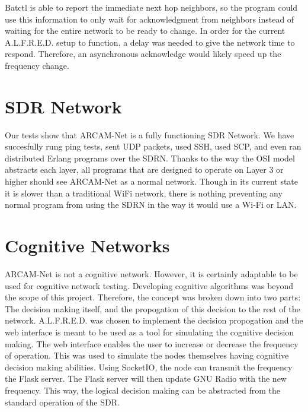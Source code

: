Batctl is able to report the immediate next hop neighbors, so the program could use this information to only wait for acknowledgment from neighbors instead of waiting for the entire network to be ready to change. In order for the current A.L.F.R.E.D. setup to function, a delay was needed to give the network time to respond. Therefore, an asynchronous acknowledge would likely speed up the frequency change. 



\section{SDR Network}

Our tests show that ARCAM-Net is a fully functioning SDR Network. We have succesfully rung ping tests, sent UDP packets, used SSH, used SCP, and even ran distributed Erlang programs over the SDRN. Thanks to the way the OSI model abstracts each layer, all programs that are designed to operate on Layer 3 or higher should see ARCAM-Net as a normal network. Though in its current state it is slower than a traditional WiFi network, there is nothing preventing any normal program from using the SDRN in the way it would use a Wi-Fi or LAN. 


\section{Cognitive Networks}

ARCAM-Net is not a cognitive network. However, it is certainly adaptable to be used for cognitive network testing. Developing cognitive algorithms was beyond the scope of this project. Therefore, the concept was broken down into two parts: The decision making itself, and the propogation of this decision to the rest of the network. A.L.F.R.E.D. was chosen to implement the decision propogation and the web interface is meant to be used as a tool for simulating the cognitive decision making. The web interface enables the user to increase or decrease the frequency of operation. This was used to simulate the nodes themselves having cognitive decision making abilities. Using SocketIO, the node can transmit the frequency the Flask server. The Flask server will then update GNU Radio with the new frequency. This way, the logical decision making can be abstracted from the standard operation of the SDR. 

